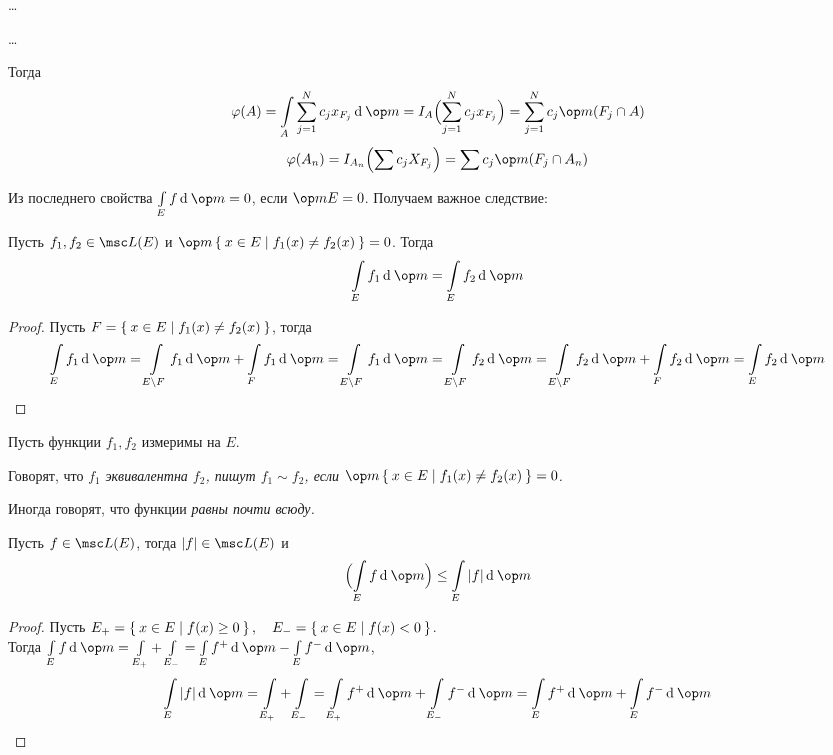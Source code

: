 \begin{eproof}
	\item \dots

	\item \dots

	Тогда
	$$ \phi(A) = \int\limits_A \sum_{j = 1}^N c_j x_{F_j} \di \op m = I_A \Bigl( \sum_{j = 1}^N c_j x_{F_j} \Bigr) = \sum_{j = 1}^N c_j \op m(F_j \cap A) $$
	$$ \phi(A_n) = I_{A_n} \Bigl( \sum c_j X_{F_j} \Bigr) = \sum c_j \op m (F_j \cap A_n) $$
\end{eproof}

Из последнего свойства $ \int\limits_E f \di \op m = 0 $, если $ \op m E = 0 $. Получаем важное следствие:
\begin{implication}
	Пусть $ f_1, f_2 \in \msc L(E) $ и $ \op m \set{x \in E \mid f_1(x) \ne f_2(x)} = 0 $. Тогда
	$$ \int\limits_E f_1 \di \op m = \int\limits_E f_2 \di \op m $$
\end{implication}

\begin{proof}
	Пусть $ F = \Set{x \in E \mid f_1(x) \ne f_2(x)} $, тогда
	$$ \int\limits_E f_1 \di \op m = \int\limits_{E \setminus F} f_1 \di \op m + \int\limits_F f_1 \di \op m = \int\limits_{E \setminus F} f_1 \di \op m = \int\limits_{E \setminus F} f_2 \di \op m = \int\limits_{E \setminus F} f_2 \di \op m + \int\limits_F f_2 \di \op m = \int\limits_E f_2 \di \op m $$
\end{proof}

\begin{definition}
	Пусть функции $ f_1, f_2 $ измеримы на $ E $.

	Говорят, что $ f_1 $ \it{эквивалентна} $ f_2 $, пишут $ f_1 \sim f_2 $, если $ \op m \set{x \in E \mid f_1(x) \ne f_2(x) } = 0 $.
\end{definition}

\begin{note}
	Иногда говорят, что функции \it{равны почти всюду}.
\end{note}

\begin{theorem}
	Пусть $ f \in \msc L(E) $, тогда $ |f| \in \msc L(E) $ и
	$$ \Bigl( \int\limits_E f \di \op m \Bigr) \le \int\limits_E |f| \di \op m $$
\end{theorem}

\begin{proof}
	Пусть $ E_+ = \Set{x \in E \mid f(x) \ge 0}, \quad E_- = \Set{x \in E \mid f(x) < 0} $. \\
	Тогда $ \int\limits_E f \di \op m = \int\limits_{E_+} + \int\limits_{E_-} = \int\limits_E f^+ \di \op m - \int\limits_E f^- \di \op m $,
	$$ \int\limits_E |f| \di \op m = \int \limits_{E_+} + \int \limits_{E_-} = \int\limits_{E_+} f^+ \di \op m + \int \limits_{E_-} f^- \di \op m = \int \limits_E f^+ \di \op m + \int \limits_E f^- \di \op m $$
\end{proof}

